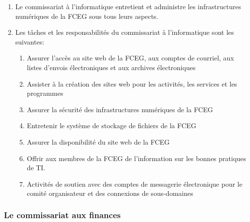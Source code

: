 \begin{enumerate}
 \item
  Le commissariat à l’informatique entretient et administre les infrastructures numériques de la FCEG sous tous leurs aspects.
 \item
  Les tâches et les responsabilités du commissariat à l’informatique sont les suivantes:

  \begin{enumerate}
   \item
    Assurer l’accès au site web de la FCEG, aux comptes de courriel, aux listes d’envois électroniques et aux archives électroniques
   \item
    Assister à la création des sites web pour les activités, les services et les programmes
   \item
    Assurer la sécurité des infrastructures numériques de la FCEG
   \item
    Entretenir le système de stockage de fichiers de la FCEG
   \item
    Assurer la disponibilité du site web de la FCEG
   \item
    Offrir aux membres de la FCEG de l’information sur les bonnes pratiques de TI.
   \item
    Activités de soutien avec des comptes de messagerie électronique pour le comité organisateur et des connexions de sous-domaines
  \end{enumerate}
\end{enumerate}

\subsubsection{Le commissariat aux finances}
\label{lela-commissaire-aux-finances}

